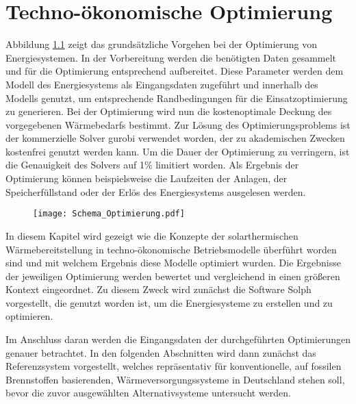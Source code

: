 \chapter{Techno-ökonomische Optimierung}\label{chapter: Techno-ökonomische Betriebsmodelle}
\thispagestyle{empty}
Abbildung \ref{fig: Schema_Optimierung} zeigt das grundsätzliche Vorgehen bei der Optimierung von Energiesystemen. In der Vorbereitung werden die benötigten Daten gesammelt und für die Optimierung entsprechend aufbereitet. Diese Parameter werden dem Modell des Energiesystems als Eingangsdaten zugeführt und innerhalb des Modells genutzt, um entsprechende Randbedingungen für die Einsatzoptimierung zu generieren. Bei der Optimierung wird nun die kostenoptimale Deckung des vorgegebenen Wärmebedarfs bestimmt. Zur Lösung des Optimierungsproblems ist der kommerzielle Solver gurobi \cite{gurobi} verwendet worden, der zu akademischen Zwecken kostenfrei genutzt werden kann. Um die Dauer der Optimierung zu verringern, ist die Genauigkeit des Solvers auf 1\% limitiert worden. Als Ergebnis der Optimierung können beispielsweise die Laufzeiten der Anlagen, der Speicherfüllstand oder der Erlös des Energiesystems ausgelesen werden.
	\begin{figure}[ht]
		\centering
		\texttt{[image: Schema\_Optimierung.pdf]}
		\label{fig: Schema_Optimierung}
	\end{figure}

In diesem Kapitel wird gezeigt wie die Konzepte der solarthermischen Wärmebereitstellung in techno-ökonomische Betriebsmodelle überführt worden sind und mit welchem Ergebnis diese Modelle optimiert wurden. Die Ergebnisse der jeweiligen Optimierung werden bewertet und vergleichend in einen größeren Kontext eingeordnet. Zu diesem Zweck wird zunächst die Software Solph vorgestellt, die genutzt worden ist, um die Energiesysteme zu erstellen und zu optimieren. 

Im Anschluss daran werden die Eingangsdaten der durchgeführten Optimierungen genauer betrachtet. In den folgenden Abschnitten wird dann zunächst das Referenzsystem vorgestellt, welches repräsentativ für konventionelle, auf fossilen Brennstoffen basierenden, Wärmeversorgungssysteme in Deutschland stehen soll, bevor die zuvor ausgewählten Alternativsysteme untersucht werden.


